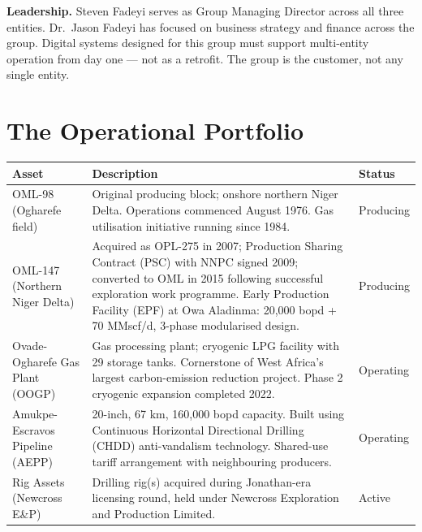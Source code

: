 \documentclass[10pt]{article}
\begin{document}
\vspace{4pt}
{\small\color{darkgrey}
\textbf{Leadership.}\enspace
Steven Fadeyi serves as Group Managing Director across all three entities.
Dr.\ Jason Fadeyi has focused on business strategy and finance across the group.
Digital systems designed for this group must support multi-entity operation from
day one --- not as a retrofit. The group is the customer, not any single entity.
}

\vspace{10pt}

\section{The Operational Portfolio}

\small
\begin{tabularx}{\columnwidth}{@{}lXl@{}}
\toprule
\textbf{Asset} & \textbf{Description} & \textbf{Status} \\
\midrule
OML-98 (Ogharefe field)
  & Original producing block; onshore northern Niger Delta. Operations commenced
    August 1976. Gas utilisation initiative running since 1984.
  & Producing \\[4pt]
OML-147 (Northern Niger Delta)
  & Acquired as OPL-275 in 2007; Production Sharing Contract (PSC) with NNPC
    signed 2009; converted to OML in 2015 following successful exploration work
    programme. Early Production Facility (EPF) at Owa Aladinma: 20,000 bopd +
    70 MMscf/d, 3-phase modularised design.
  & Producing \\[4pt]
Ovade-Ogharefe Gas Plant (OOGP)
  & Gas processing plant; cryogenic LPG facility with 29 storage tanks.
    Cornerstone of West Africa's largest carbon-emission reduction project.
    Phase 2 cryogenic expansion completed 2022.
  & Operating \\[4pt]
Amukpe-Escravos Pipeline (AEPP)
  & 20-inch, 67 km, 160,000 bopd capacity. Built using Continuous Horizontal
    Directional Drilling (CHDD) anti-vandalism technology. Shared-use tariff
    arrangement with neighbouring producers.
  & Operating \\[4pt]
Rig Assets (Newcross E\&P)
  & Drilling rig(s) acquired during Jonathan-era licensing round, held under
    Newcross Exploration and Production Limited.
  & Active \\
\bottomrule
\end{tabularx}
\normalsize
\end{document}
